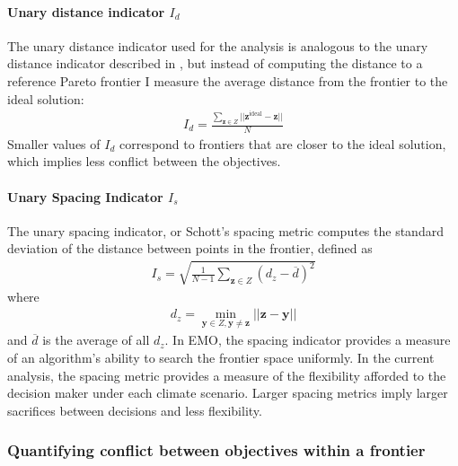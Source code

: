 \paragraph{Unary distance indicator $I_d$} The unary distance indicator used for the analysis is analogous to the unary distance indicator described in \cite{czyzzak1998pareto}, but instead of computing the distance to a reference Pareto frontier I measure the average distance from the frontier to the ideal solution:
\begin{align}
I_d = \frac{\sum_{\mathbf{z} \in Z} ||\mathbf{z}^{\text{ideal}} - \mathbf{z} ||}{N}
\end{align}
Smaller values of $I_d$ correspond to frontiers that are closer to the ideal solution, which implies less conflict between the objectives.

\paragraph{Unary Spacing Indicator $I_s$} The unary spacing indicator, or Schott's spacing metric\cite{schott1995fault} computes the standard deviation of the distance between points in the frontier, defined as
\begin{align}
I_s = \sqrt{\frac{1}{N-1} \sum_{\mathbf{z} \in Z} (d_z - \overbar{d})^2}
\end{align}
where
\begin{align}
d_z = \min_{\mathbf{y} \in Z, \mathbf{y} \neq \mathbf{z}} ||\mathbf{z} - \mathbf{y}||
\end{align}
and $\overbar{d}$ is the average of all $d_z$. In EMO, the spacing indicator provides a measure of an algorithm's ability to search the frontier space uniformly. In the current analysis, the spacing metric provides a measure of the flexibility afforded to the decision maker under each climate scenario. Larger spacing metrics imply larger sacrifices between decisions and less flexibility.

\subsubsection{Quantifying conflict between objectives within a frontier}

